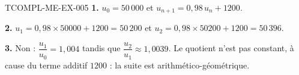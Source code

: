 \begin{corrige}{TCOMPL-ME-EX-005}
\textbf{1.} $u_0=50\,000$ et $u_{n+1}=0{,}98\,u_n+1200$.

\textbf{2.} $u_1=0{,}98\times50000+1200=50\,200$ et
$u_2=0{,}98\times50200+1200=50\,396$.

\textbf{3.} Non : $\dfrac{u_1}{u_0}=1{,}004$ tandis que
$\dfrac{u_2}{u_1}\approx1{,}0039$. Le quotient n'est pas constant, à cause du
terme additif $1200$ : la suite est arithmético-géométrique.
\end{corrige}
